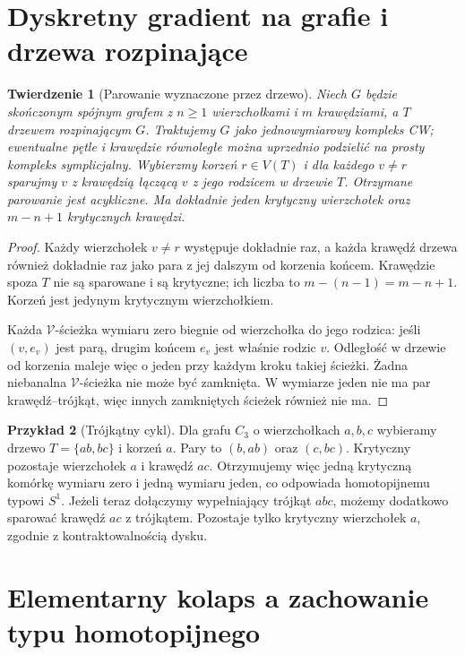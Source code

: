 \documentclass[11pt,a4paper]{report}
\numberwithin{equation}{section}
\theoremstyle{plain}
\newtheorem{twierdzenie}{Twierdzenie}[section]
\theoremstyle{definition}
\newtheorem{przyklad}[twierdzenie]{Przykład}
\theoremstyle{remark}
\begin{document}
\section{Dyskretny gradient na grafie i drzewa rozpinające}
\label{sec:tg-forman-on-graph}

\begin{twierdzenie}[Parowanie wyznaczone przez drzewo]
\label{thm:tg-forman-tree}
Niech $G$ będzie skończonym spójnym grafem z $n\ge1$
wierzchołkami i $m$ krawędziami, a $T$ drzewem
rozpinającym $G$. Traktujemy $G$ jako jednowymiarowy
kompleks CW; ewentualne pętle i krawędzie równoległe
można uprzednio podzielić na prosty kompleks symplicjalny.
Wybierzmy korzeń $r\in V(T)$ i dla każdego $v\ne r$
sparujmy $v$ z krawędzią łączącą $v$ z jego rodzicem
w drzewie $T$. Otrzymane parowanie jest acykliczne.
Ma dokładnie jeden krytyczny wierzchołek oraz
$m-n+1$ krytycznych krawędzi.
\end{twierdzenie}

\begin{proof}
Każdy wierzchołek $v\ne r$ występuje dokładnie raz,
a każda krawędź drzewa również dokładnie raz jako
para z jej dalszym od korzenia końcem. Krawędzie
spoza $T$ nie są sparowane i są krytyczne; ich liczba
to $m-(n-1)=m-n+1$. Korzeń jest jedynym krytycznym
wierzchołkiem.

Każda $\mathcal V$-ścieżka wymiaru zero biegnie
od wierzchołka do jego rodzica: jeśli
$(v,e_v)$ jest parą, drugim końcem $e_v$ jest
właśnie rodzic $v$. Odległość w drzewie od korzenia
maleje więc o jeden przy każdym kroku takiej ścieżki.
Żadna niebanalna $\mathcal V$-ścieżka nie może być
zamknięta. W wymiarze jeden nie ma par krawędź--trójkąt,
więc innych zamkniętych ścieżek również nie ma.
\end{proof}

\begin{przyklad}[Trójkątny cykl]
Dla grafu $C_3$ o wierzchołkach $a,b,c$ wybieramy
drzewo $T=\{ab,bc\}$ i korzeń $a$.
Pary to $(b,ab)$ oraz $(c,bc)$. Krytyczny pozostaje
wierzchołek $a$ i krawędź $ac$. Otrzymujemy więc
jedną krytyczną komórkę wymiaru zero i jedną
wymiaru jeden, co odpowiada homotopijnemu typowi $S^1$.
Jeżeli teraz dołączymy wypełniający trójkąt $abc$,
możemy dodatkowo sparować krawędź $ac$ z trójkątem.
Pozostaje tylko krytyczny wierzchołek $a$, zgodnie
z kontraktowalnością dysku.
\end{przyklad}

\section{Elementarny kolaps a zachowanie typu homotopijnego}
\label{sec:tg-forman-collapse}
\end{document}
